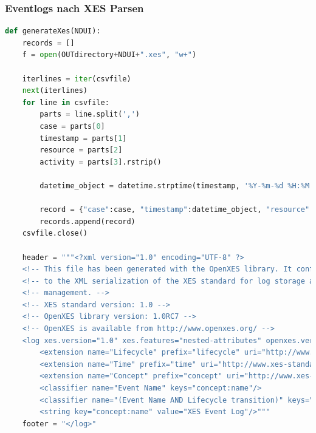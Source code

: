 \subsubsection{Eventlogs nach XES Parsen}
\begin{lstlisting}[language=Python]
def generateXes(NDUI):
    records = []
    f = open(OUTdirectory+NDUI+".xes", "w+")
  
    iterlines = iter(csvfile)
    next(iterlines)
    for line in csvfile:
        parts = line.split(',')
        case = parts[0]
        timestamp = parts[1]
        resource = parts[2]
        activity = parts[3].rstrip()
    
        datetime_object = datetime.strptime(timestamp, '%Y-%m-%d %H:%M:%S')
    
        record = {"case":case, "timestamp":datetime_object, "resource":resource, "activity":activity}
        records.append(record)
    csvfile.close()
    
    header = """<?xml version="1.0" encoding="UTF-8" ?>
    <!-- This file has been generated with the OpenXES library. It conforms -->
    <!-- to the XML serialization of the XES standard for log storage and -->
    <!-- management. -->
    <!-- XES standard version: 1.0 -->
    <!-- OpenXES library version: 1.0RC7 -->
    <!-- OpenXES is available from http://www.openxes.org/ -->
    <log xes.version="1.0" xes.features="nested-attributes" openxes.version="1.0RC7">
    	<extension name="Lifecycle" prefix="lifecycle" uri="http://www.xes-standard.org/lifecycle.xesext"/>
    	<extension name="Time" prefix="time" uri="http://www.xes-standard.org/time.xesext"/>
    	<extension name="Concept" prefix="concept" uri="http://www.xes-standard.org/concept.xesext"/>
    	<classifier name="Event Name" keys="concept:name"/>
    	<classifier name="(Event Name AND Lifecycle transition)" keys="concept:name lifecycle:transition"/>
    	<string key="concept:name" value="XES Event Log"/>"""
    footer = "</log>"
    

\end{lstlisting}
